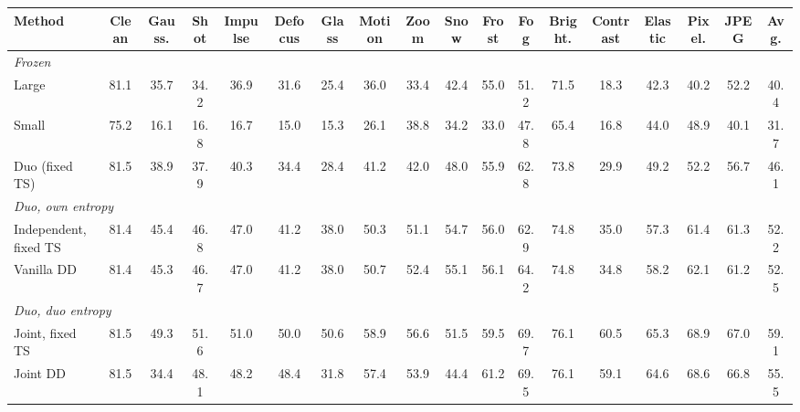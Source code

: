 \begin{table}[t]
{\begin{tabular}{l|c|ccc|cccc|cccc|cccc|c}
        \cmidrule(lr){3-5}\cmidrule(lr){6-9}\cmidrule(lr){10-13}\cmidrule(lr){14-17}
        Method & Clean & Gauss. & Shot & Impulse & Defocus & Glass & Motion & Zoom & Snow & Frost & Fog & Bright. & Contrast & Elastic & Pixel. & JPEG & Avg. \\
        \midrule
        \multicolumn{18}{l}{\textit{Frozen}} \\
        \quad Large & 81.1 & 35.7 & 34.2 & 36.9 & 31.6 & 25.4 & 36.0 & 33.4 & 42.4 & 55.0 & 51.2 & 71.5 & 18.3 & 42.3 & 40.2 & 52.2 & 40.4 \\
        \quad Small & 75.2 & 16.1 & 16.8 & 16.7 & 15.0 & 15.3 & 26.1 & 38.8 & 34.2 & 33.0 & 47.8 & 65.4 & 16.8 & 44.0 & 48.9 & 40.1 & 31.7 \\
        \quad Duo (fixed TS) & 81.5 & 38.9 & 37.9 & 40.3 & 34.4 & 28.4 & 41.2 & 42.0 & 48.0 & 55.9 & 62.8 & 73.8 & 29.9 & 49.2 & 52.2 & 56.7 & 46.1 \\
        \midrule
        \multicolumn{18}{l}{\textit{Duo, own entropy}} \\
        \quad Independent, fixed TS & 81.4 & 45.4 & 46.8 & 47.0 & 41.2 & 38.0 & 50.3 & 51.1 & 54.7 & 56.0 & 62.9 & 74.8 & 35.0 & 57.3 & 61.4 & 61.3 & 52.2 \\
        \quad Vanilla DD & 81.4 & 45.3 & 46.7 & 47.0 & 41.2 & 38.0 & 50.7 & 52.4 & 55.1 & 56.1 & 64.2 & 74.8 & 34.8 & 58.2 & 62.1 & 61.2 & 52.5 \\
        \midrule
        \multicolumn{18}{l}{\textit{Duo, duo entropy}} \\
        \quad Joint, fixed TS & 81.5 & 49.3 & 51.6 & 51.0 & 50.0 & 50.6 & 58.9 & 56.6 & 51.5 & 59.5 & 69.7 & 76.1 & 60.5 & 65.3 & 68.9 & 67.0 & 59.1 \\
        \quad Joint DD & 81.5 & 34.4 & 48.1 & 48.2 & 48.4 & 31.8 & 57.4 & 53.9 & 44.4 & 61.2 & 69.5 & 76.1 & 59.1 & 64.6 & 68.6 & 66.8 & 55.5 \\
        \bottomrule
    \end{tabular}%
    }
\end{table}
